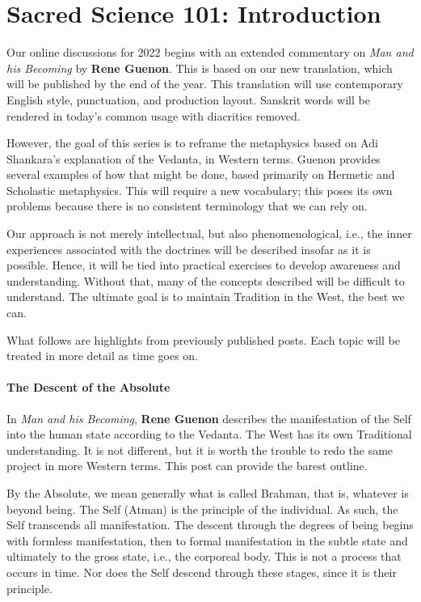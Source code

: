 \section{Sacred Science 101: Introduction}

Our online discussions for 2022 begins with an extended commentary on \emph{Man and his Becoming} by \textbf{Rene Guenon}. This is based on our new translation, which will be published by the end of the year. This translation will use contemporary English style, punctuation, and production layout. Sanskrit words will be rendered in today's common usage with diacritics removed.

However, the goal of this series is to reframe the metaphysics based on Adi Shankara's explanation of the Vedanta, in Western terms. Guenon provides several examples of how that might be done, based primarily on Hermetic and Scholastic metaphysics. This will require a new vocabulary; this poses its own problems because there is no consistent terminology that we can rely on.

Our approach is not merely intellectual, but also phenomenological, i.e., the inner experiences associated with the doctrines will be described insofar as it is possible. Hence, it will be tied into practical exercises to develop awareness and understanding. Without that, many of the concepts described will be difficult to understand. The ultimate goal is to maintain Tradition in the West, the best we can.

What follows are highlights from previously published posts. Each topic will be treated in more detail as time goes on.

\paragraph{The Descent of the Absolute}
In \emph{Man and his Becoming}, \textbf{Rene Guenon} describes the manifestation of the Self into the human state according to the Vedanta. The West has its own Traditional understanding. It is not different, but it is worth the trouble to redo the same project in more Western terms. This post can provide the barest outline.

By the Absolute, we mean generally what is called Brahman, that is, whatever is beyond being. The Self (Atman) is the principle of the individual. As such, the Self transcends all manifestation. The descent through the degrees of being begins with formless manifestation, then to formal manifestation in the subtle state and ultimately to the gross state, i.e., the corporeal body. This is not a process that occurs in time. Nor does the Self descend through these stages, since it is their principle.

